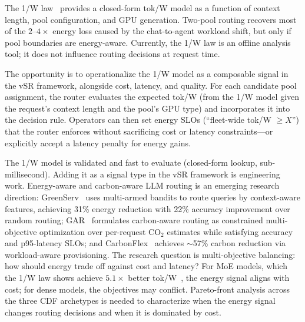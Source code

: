 \begin{opportunity}
\label{opp:energy-signal}
The 1/W law~\cite{onewlaw2026} provides a closed-form tok/W model
as a function of context length, pool configuration, and GPU
generation.  Two-pool routing recovers most of the
$2$--$4\times$ energy loss caused by the chat-to-agent workload
shift, but only if pool boundaries are energy-aware.  Currently,
the 1/W law is an offline analysis tool; it does not influence
routing decisions at request time.

The opportunity is to operationalize the 1/W model as a composable
signal in the vSR framework, alongside cost, latency, and quality.
For each candidate pool assignment, the router evaluates the
expected tok/W (from the 1/W model given the request's context
length and the pool's GPU type) and incorporates it into the
decision rule.  Operators can then set energy SLOs (``fleet-wide
tok/W $\geq X$'') that the router enforces without sacrificing
cost or latency constraints---or explicitly accept a latency
penalty for energy gains.

\begin{frisk}
The 1/W model is validated and fast to evaluate (closed-form
lookup, sub-millisecond).  Adding it as a signal type in the vSR
framework is engineering work.  Energy-aware and carbon-aware LLM
routing is an emerging research direction:
GreenServ~\cite{greenserv2026} uses multi-armed bandits to route
queries by context-aware features, achieving 31\% energy reduction
with 22\% accuracy improvement over random routing;
GAR~\cite{gar2026} formulates carbon-aware routing as constrained
multi-objective optimization over per-request CO$_2$ estimates
while satisfying accuracy and p95-latency SLOs; and
CarbonFlex~\cite{carbonflex2026} achieves $\sim$57\% carbon
reduction via workload-aware provisioning.  The research question
is multi-objective balancing: how should energy trade off against
cost and latency?  For MoE models, which the 1/W law shows achieve
$5.1\times$ better tok/W~\cite{onewlaw2026}, the energy signal
aligns with cost; for dense models, the objectives may conflict.
Pareto-front analysis across the three CDF archetypes is needed to
characterize when the energy signal changes routing decisions and
when it is dominated by cost.
\end{frisk}
\end{opportunity}

